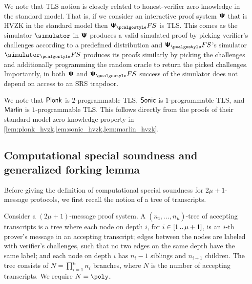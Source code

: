   
\begin{remark}
  We note that TLS notion is closely related to honest-verifier zero knowledge in the
  standard model. That is, if we consider an interactive proof system $\bm{\mathsf{\Psi}}$
  that is HVZK in the standard model then $\proofsystem_\fs$ is TLS. This comes as the simulator $\simulator$ in
  $\bm{\mathsf{\Psi}}$ produces a valid simulated proof by picking verifier's challenges
  according to a predefined distribution and $\proofsystem_\fs$'s simulator
  $\simulator_\fs$ produces its proofs similarly by picking the challenges and
  additionally programming the random oracle to return the picked
  challenges. Importantly, in both $\bm{\mathsf{\Psi}}$ and $\proofsystem_\fs$ success of
  the simulator does not depend on access to an SRS trapdoor.
\end{remark}

We note that $\textnormal{\textsf{Plonk}}$ is $2$-programmable TLS, ${\textnormal{\textsf{Sonic}}}$ is $1$-programmable TLS,
and ${\textnormal{\textsf{Marlin}}}$ is $1$-programmable TLS. This follows directly from the proofs of
their standard model zero-knowledge property in
\cref{lem:plonk_hvzk,lem:sonic_hvzk,lem:marlin_hvzk}. 

\subsection{Computational special soundness and generalized forking lemma}

Before giving the definition of computational special soundness for $2\mu + 1$-message protocols, we first recall the notion of a tree of transcripts.
\begin{definition}
	\label{def:tree_of_accepting_transcripts}
	Consider a $(2\mu + 1)$-message proof system. A $(n_1,
  \ldots, n_\mu)$-tree of accepting transcripts is a tree where each node on
  depth $i$, for $i \in [1 \, .. \, \mu + 1]$, is an $i$-th prover's message in an
  accepting transcript; edges between the nodes are labeled with verifier's
  challenges, such that no two edges on the same depth have the same
  label; and each node on depth $i$ has $n_{i} - 1$ siblings and $n_{i +
    1}$ children. The tree consists of $N = \prod_{i = 1}^\mu n_i$
  branches, where $N$ is the number of accepting transcripts. We require $N = \poly$. 
\end{definition}

\iffalse
		
